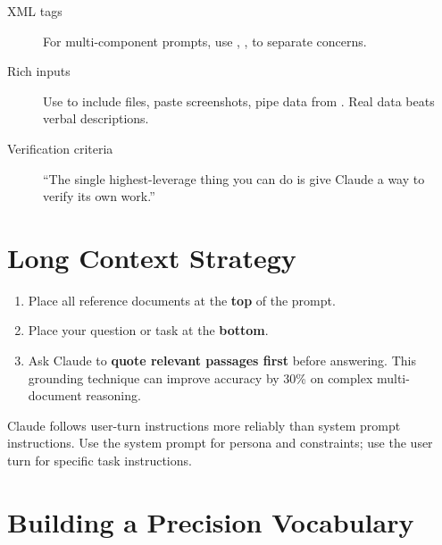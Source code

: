 \begin{description}
  \item[XML tags] For multi-component prompts, use , ,
     to separate concerns.
  \item[Rich inputs] Use  to include files, paste screenshots,
    pipe data from . Real data beats verbal descriptions.
  \item[Verification criteria] ``The single highest-leverage thing you can do
    is give Claude a way to verify its own work.''
\end{description}


\section{Long Context Strategy}
\label{sec:long-context}



\begin{enumerate}
  \item Place all reference documents at the \textbf{top} of the prompt.
  \item Place your question or task at the \textbf{bottom}.
  \item Ask Claude to \textbf{quote relevant passages first} before answering.
    This grounding technique can improve accuracy by 30\% on complex multi-document reasoning.
\end{enumerate}

Claude follows user-turn instructions more reliably than system prompt instructions.
Use the system prompt for persona and constraints; use the user turn for
specific task instructions.

\section{Building a Precision Vocabulary}
\label{sec:precision}

